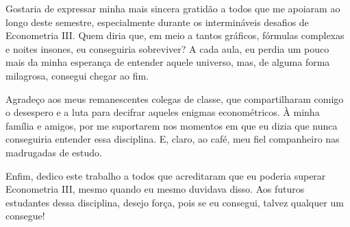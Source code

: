 \begin{agradecimentos}
    Gostaria de expressar minha mais sincera gratidão a todos que me apoiaram ao longo deste semestre, especialmente durante os intermináveis desafios de Econometria III. Quem diria que, em meio a tantos gráficos, fórmulas complexas e noites insones, eu conseguiria sobreviver? A cada aula, eu perdia um pouco mais da minha esperança de entender aquele universo, mas, de alguma forma milagrosa, consegui chegar ao fim.

    Agradeço aos meus remanescentes colegas de classe, que compartilharam comigo o desespero e a luta para decifrar aqueles enigmas econométricos. À minha família e amigos, por me suportarem nos momentos em que eu dizia que nunca conseguiria entender essa disciplina. E, claro, ao café, meu fiel companheiro nas madrugadas de estudo.
    
    Enfim, dedico este trabalho a todos que acreditaram que eu poderia superar Econometria III, mesmo quando eu mesmo duvidava disso. Aos futuros estudantes dessa disciplina, desejo força, pois se eu consegui, talvez qualquer um consegue!

\end{agradecimentos}
